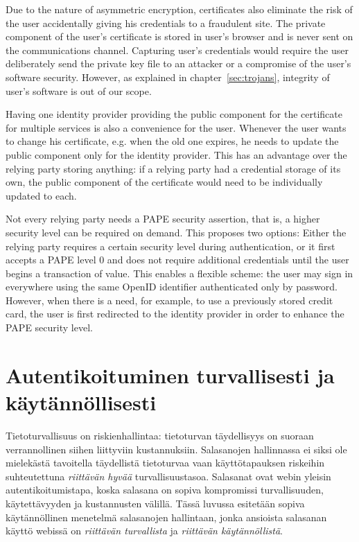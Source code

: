\documentclass[english,gradu]{tktltiki}
\begin{document}
    Due to the nature of asymmetric encryption, certificates also eliminate the risk of the user accidentally giving his credentials to a fraudulent site. The private component of the user's certificate is stored in user's browser and is never sent on the communications channel. Capturing user's credentials would require the user deliberately send the private key file to an attacker or a compromise of the user's software security. However, as explained in chapter~\ref{sec:trojans}, integrity of user's software is out of our scope.

      Having one identity provider providing the public component for the certificate for multiple services is also a convenience for the user. Whenever the user wants to change his certificate, e.g. when the old one expires, he needs to update the public component only for the identity provider. This has an advantage over the relying party storing anything: if a relying party had a credential storage of its own, the public component of the certificate would need to be individually updated to each.

      Not every relying party needs a PAPE security assertion, that is, a higher security level can be required on demand. This proposes two options: Either the relying party requires a certain security level during authentication, or it first accepts a PAPE level 0 and does not require additional credentials until the user begins a transaction of value. This enables a flexible scheme: the user may sign in everywhere using the same OpenID identifier authenticated only by password. However, when there is a need, for example, to use a previously stored credit card, the user is first redirected to the identity provider in order to enhance the PAPE security level.




\section{Autentikoituminen turvallisesti ja käytännöllisesti}

Tietoturvallisuus on riskienhallintaa: tietoturvan täydellisyys on suoraan verrannollinen siihen liittyviin kustannuksiin. Salasanojen hallinnassa ei siksi ole mielekästä tavoitella täydellistä tietoturvaa vaan käyttötapauksen riskeihin suhteutettuna \emph{riittävän hyvää} turvallisuustasoa. Salasanat ovat webin yleisin autentikoitumistapa, koska salasana on sopiva kompromissi turvallisuuden, käytettävyyden ja kustannusten välillä. Tässä luvussa esitetään sopiva käytännöllinen menetelmä salasanojen hallintaan, jonka ansioista salasanan käyttö webissä on \emph{riittävän turvallista} ja \emph{riittävän käytännöllistä}.
\end{document}
